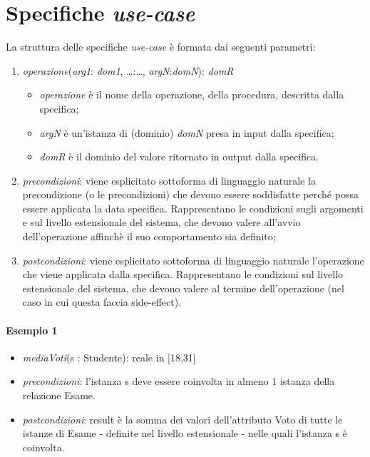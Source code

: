 \section{Specifiche \textit{use-case}}
La struttura delle specifiche \textit{use-case} è formata dai seguenti parametri:
\begin{enumerate}
    \item \textit{operazione}(\textit{arg1}: \textit{dom1}, \ldots:\ldots, \textit{argN}:\textit{domN}): \textit{domR}
    \begin{itemize}
        \item \textit{operazione} è il nome della operazione, della procedura, descritta dalla specifica;
        \item \textit{argN} è un'istanza di (dominio) \textit{domN} presa in input dalla specifica;
        \item \textit{domR} è il dominio del valore ritornato in output dalla specifica.
    \end{itemize}
    \item \textit{precondizioni}: viene esplicitato sottoforma di linguaggio naturale la precondizione (o le precondizioni) che devono essere soddisfatte perché possa essere applicata la data specifica. Rappresentano le condizioni sugli argomenti e sul livello estensionale del sistema, che devono valere all'avvio dell'operazione affinchè il suo comportamento sia definito;
    \item \textit{postcondizioni}: viene esplicitato sottoforma di linguaggio naturale l'operazione che viene applicata dalla specifica. Rappresentano le condizioni sul livello estensionale del sistema, che devono valere al termine dell'operazione (nel caso in cui questa faccia side-effect).
\end{enumerate}

\paragraph{Esempio 1}
\begin{itemize}
    \item \textit{mediaVoti}(s : Studente): reale in [18,31]
    \item \textit{precondizioni}: l'istanza s deve essere coinvolta in almeno 1 istanza della relazione Esame.
    \item \textit{postcondizioni}: result è la somma dei valori dell'attributo Voto di tutte le istanze di Esame - definite nel livello estensionale - nelle quali l'istanza s è coinvolta.
\end{itemize}
